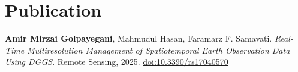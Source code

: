 \documentclass[a4paper,10pt]{article}
\newcommand{\resumeItem}[1]{\item #1}
\newcommand{\resumeSubheading}[4]{
    \textbf{#1} \hfill #2 \\
    \textit{#3} \hfill \textit{#4}
}
\begin{document}
\section*{Publication}

\textbf{Amir Mirzai Golpayegani}, Mahmudul Hasan, Faramarz F. Samavati. 
\textit{Real-Time Multiresolution Management of Spatiotemporal Earth Observation Data Using DGGS}. 
Remote Sensing, 2025. \href{https://doi.org/10.3390/rs17040570}{doi:10.3390/rs17040570}









\end{document}
